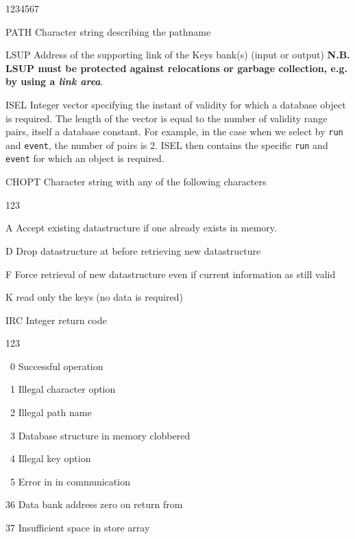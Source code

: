 
\begin{DLtt}{1234567}
\item[PATH]Character string describing the pathname
\item[LSUP]Address of the supporting link of the
  Keys bank(s)    (input or output)
  {\bf N.B. LSUP must be protected against relocations or garbage
collection, e.g. by using a {\it link area}}.
\item[ISEL]Integer vector specifying the instant of validity
for which a database object is required. The length of the vector
is equal to the number of validity range pairs, itself a database constant.
For example, in the case when we select by {\tt run} and {\tt event},
the number of pairs is 2. ISEL then contains the specific {\tt run}
and {\tt event} for which an object is required.
\item[CHOPT]Character string with any of the following characters
  \begin{DLtt}{123}
    \item[A]Accept existing datastructure if one already exists in memory.
    \item[D]Drop datastructure at  before retrieving new datastructure
    \item[F]Force retrieval of new datastructure even if current information
    as still valid
    \item[K]read only the keys (no data is required)
  \end{DLtt}
\item[IRC]Integer return code
  \begin{DLtt}{123}
    \item[\ 0] Successful operation
    \item[\ 1]Illegal character option
    \item[\ 2]Illegal path name
    \item[\ 3]Database structure in memory clobbered
    \item[\ 4]Illegal key option
    \item[\ 5]Error in  in  communication
    \item[36]Data bank address zero on return from 
    \item[37]Insufficient space in  store array
  \end{DLtt}
\end{DLtt}

